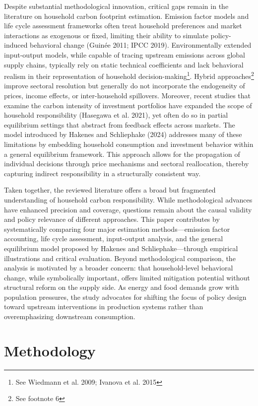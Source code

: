 \documentclass[12pt,a4paper]{article}%
\begin{document}
Despite substantial methodological innovation, critical gaps remain in the literature on household carbon footprint estimation. Emission factor models and life cycle assessment frameworks often treat household preferences and market interactions as exogenous or fixed, limiting their ability to simulate policy-induced behavioral change (Guinée 2011; IPCC 2019). Environmentally extended input-output models, while capable of tracing upstream emissions across global supply chains, typically rely on static technical coefficients and lack behavioral realism in their representation of household decision-making\footnote{See Wiedmann et al. 2009; Ivanova et al. 2015}. Hybrid approaches\footnote{See footnote 6} improve sectoral resolution but generally do not incorporate the endogeneity of prices, income effects, or inter-household spillovers. Moreover, recent studies that examine the carbon intensity of investment portfolios have expanded the scope of household responsibility (Hasegawa et al. 2021), yet often do so in partial equilibrium settings that abstract from feedback effects across markets. The model introduced by Hakenes and Schliephake (2024) addresses many of these limitations by embedding household consumption and investment behavior within a general equilibrium framework. This approach allows for the propagation of individual decisions through price mechanisms and sectoral reallocation, thereby capturing indirect responsibility in a structurally consistent way.

Taken together, the reviewed literature offers a broad but fragmented understanding of household carbon responsibility. While methodological advances have enhanced precision and coverage, questions remain about the causal validity and policy relevance of different approaches. This paper contributes by systematically comparing four major estimation methods—emission factor accounting, life cycle assessment, input-output analysis, and the general equilibrium model proposed by Hakenes and Schliephake—through empirical illustrations and critical evaluation. Beyond methodological comparison, the analysis is motivated by a broader concern: that household-level behavioral change, while symbolically important, offers limited mitigation potential without structural reform on the supply side. As energy and food demands grow with population pressures, the study advocates for shifting the focus of policy design toward upstream interventions in production systems rather than overemphasizing downstream consumption.

\section{Methodology}
\end{document}

